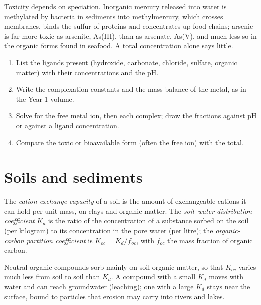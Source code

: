 Toxicity depends on speciation. Inorganic mercury released into water is
methylated by bacteria in sediments into methylmercury, which crosses membranes,
binds the sulfur of proteins and concentrates up food chains; arsenic is far more
toxic as arsenite, As(III), than as arsenate, As(V), and much less so in the organic
forms found in seafood. A total concentration alone says little.

\begin{method}\label{met:b3:environmental-toxicology:speciation}
\begin{enumerate}
  \item List the ligands present (hydroxide, carbonate, chloride, sulfate, organic
        matter) with their concentrations and the pH.
  \item Write the complexation constants and the mass balance of the metal, as in the
        Year 1 volume.
  \item Solve for the free metal ion, then each complex; draw the fractions against
        pH or against a ligand concentration.
  \item Compare the toxic or bioavailable form (often the free ion) with the total.
\end{enumerate}
\end{method}

\section{Soils and sediments}

\begin{definition}\label{def:b3:environmental-toxicology:soil}
The \emph{cation exchange capacity} of a soil is
the amount of exchangeable cations it can hold per unit mass, on clays and organic
matter. The \emph{soil--water distribution coefficient} $K_d$ is the ratio of the concentration of a substance
sorbed on the soil (per kilogram) to its concentration in the pore water (per
litre); the \emph{organic-carbon partition coefficient} is $K_{oc} = K_d/f_{oc}$, with $f_{oc}$ the mass fraction of organic carbon.
\end{definition}

Neutral organic compounds sorb mainly on soil organic matter, so that $K_{oc}$ varies
much less from soil to soil than $K_d$. A compound with a small $K_d$ moves with water
and can reach groundwater (leaching); one with a large $K_d$ stays near the surface,
bound to particles that erosion may carry into rivers and lakes.

